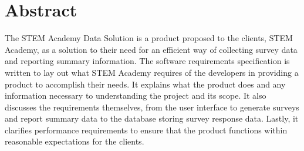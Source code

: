 







\section{Abstract}
The STEM Academy Data Solution is a product proposed to the clients, STEM Academy, as a solution to their need for an efficient way of collecting survey data and reporting summary information.
The software requirements specification is written to lay out what STEM Academy requires of the developers in providing a product to accomplish their needs.
It explains what the product does and any information necessary to understanding the project and its scope.
It also discusses the requirements themselves, from the user interface to generate surveys and report summary data to the database storing survey response data.
Lastly, it clarifies performance requirements to ensure that the product functions within reasonable expectations for the clients.

